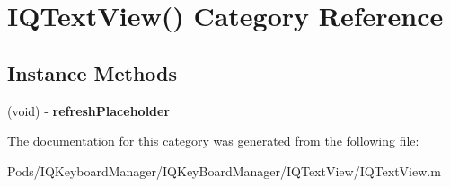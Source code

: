 \hypertarget{category_i_q_text_view_07_08}{}\section{I\+Q\+Text\+View() Category Reference}
\label{category_i_q_text_view_07_08}
\subsection*{Instance Methods}
\begin{DoxyCompactItemize}
\item 
\mbox{\label{category_i_q_text_view_07_08_a6c443576840c3963fe692efe510880e6}} 
(void) -\/ {\bfseries refresh\+Placeholder}
\end{DoxyCompactItemize}


The documentation for this category was generated from the following file\+:\begin{DoxyCompactItemize}
\item 
Pods/\+I\+Q\+Keyboard\+Manager/\+I\+Q\+Key\+Board\+Manager/\+I\+Q\+Text\+View/I\+Q\+Text\+View.\+m\end{DoxyCompactItemize}
